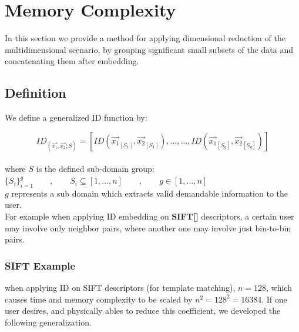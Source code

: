
\chapter{Memory Complexity} %

\label{Chapter7}

In this section we provide a method for applying dimensional reduction of the multidimensional scenario, by grouping significant small subsets of the data and concatenating them after embedding. 


\section{Definition}

We define a generalized ID function by:

\begin{equation}
ID_(\overrightarrow{x_1} , \overrightarrow{x_2} ; S) = [ ID(\overrightarrow{x_1}_[S_1],\overrightarrow{x_2}_[S_1]) , \dots , \dots , ID(\overrightarrow{x_1}_[S_g],\overrightarrow{x_2}_[S_g])  ]
\end{equation}
\\
where $S$ is the defined sub-domain group: \\ 

$\{S_i\}_{i=1}^g \qquad,\qquad S_i\subseteq [1, \dots , n] \qquad , \qquad g \in [1, \dots , n]$ \\ 

$g$ represents a sub domain which extracts valid demandable information to the user. \\ 

For example when applying ID embedding on \textbf{SIFT[]} descriptors, a certain user may involve only neighbor pairs, where another one may involve just bin-to-bin pairs.

\subsection{SIFT Example}

when applying ID on SIFT descriptors (for template matching),  $n = 128$, which causes time and memory complexity to be scaled by $n^2=128^2=16384$. 
If one user desires, and physically ables to reduce this coefficient, we developed the following generalization.

